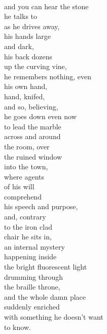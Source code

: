 \documentclass[smalldemyvopaper,11pt,twoside,onecolumn,openright,extrafontsizes]{memoir}
\begin{document}
\\and you can hear the stone
\\he talks to
\\as he drives away,
\\his hands large
\\and dark,
\\his back dozens
\\up the curving vine,
\\he remembers nothing, even
\\his own hand,
\\hand, knifed,
\\and so, believing,
\\he goes down even now
\\to lead the marble
\\across and around
\\the room, over
\\the ruined window
\\into the town,
\\where agents
\\of his will
\\comprehend
\\his speech and purpose,
\\and, contrary
\\to the iron clad
\\chair he sits in,
\\an internal mystery
\\happening inside
\\the bright fluorescent light
\\drumming through
\\the braille throne,
\\and the whole damn place
\\suddenly enriched
\\with something he doesn't want
\\to know.
\end{document}
